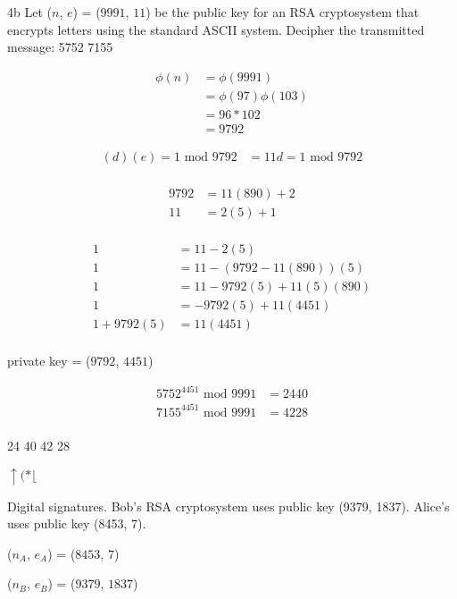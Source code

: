 \begin{question}{4b}
Let ($n$, $e$) = ($9991$, $11$) be the public key for an RSA cryptosystem that encrypts
letters using the standard ASCII system. Decipher the transmitted message: 5752 7155

\begin{align*}
\phi(n) &= \phi(9991)\\
		&= \phi(97)\phi(103)\\
		&= 96 * 102\\
		&= 9792
\end{align*}

\begin{align*}
(d)(e) = 1 \textrm{ mod } 9792 &= 11d = 1 \textrm{ mod }  9792 \\
\end{align*}


\begin{align*}
9792 &= 11(890) + 2 \\
11 &= 2(5) + 1 \\
\end{align*}

\begin{align*}
1 &= 11 - 2(5) \\
1 &= 11 - (9792 - 11(890))(5) \\
1 &= 11 - 9792(5) + 11(5)(890) \\
1 &= - 9792(5) + 11(4451) \\
1 + 9792(5) &= 11(4451) \\
\end{align*}

private key = ($9792$, $4451$)

\begin{align*}
5752^{4451} \textrm{ mod } 9991 &= 2440 \\
7155^{4451} \textrm{ mod } 9991 &= 4228 \\
\end{align*}

24 40 42 28

$\uparrow(*\lfloor$
\end{question}


\begin{question}{5}
Digital signatures. Bob's RSA cryptosystem uses public key (9379, 1837). Alice's uses
public key (8453, 7).

($n_A$, $e_A$) = ($8453$, $7$)

($n_B$, $e_B$) = ($9379$, $1837$)
\end{question}


